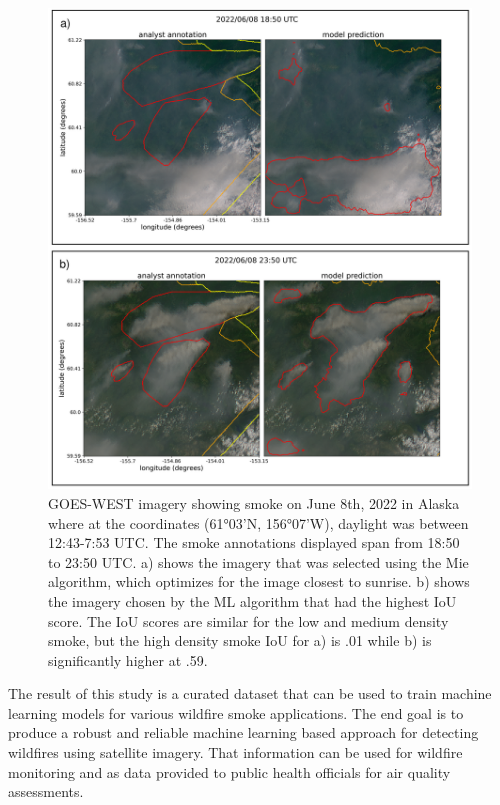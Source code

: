 \documentclass{ametsocV6.1}
\begin{document}
\begin{figure}
    \centering
    \includegraphics[width=15cm]{figures/ML_better_than_Mei_2.png}
    \caption{GOES-WEST imagery showing smoke on June 8th, 2022 in Alaska where at the coordinates (61°03'N, 156°07'W), daylight was between 12:43-7:53 UTC. The smoke annotations displayed span from 18:50 to 23:50 UTC. a) shows the imagery that was selected using the Mie algorithm, which optimizes for the image closest to sunrise. b) shows the imagery chosen by the ML algorithm that had the highest IoU score. The IoU scores are similar for the low and medium density smoke, but the
    high density smoke IoU for a) is .01 while b) is significantly higher at .59.}\label{ml_vs_mei}
\end{figure}


The result of this study is a curated dataset that can be used to train machine learning models for various wildfire smoke applications. The end goal is to produce a robust and reliable machine learning based approach for detecting wildfires using satellite imagery. That information can be used for wildfire monitoring and as data provided to public health officials for air quality assessments.



\clearpage

\acknowledgments

\datastatement







\end{document}
